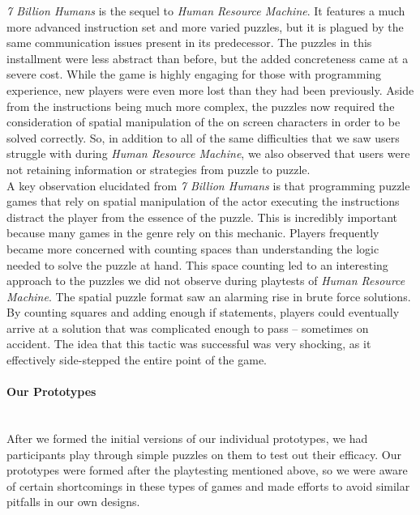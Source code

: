 \textit{7 Billion Humans} is the sequel to \textit{Human Resource Machine}.  It features a 
much more advanced instruction set and more varied puzzles, but it is plagued by the same 
communication issues present in its predecessor. The puzzles in this installment were less 
abstract than before, but the added concreteness came at a severe cost. While the game 
is highly engaging for those with programming experience, new players were even more 
lost than they had been previously. Aside from the instructions being much more complex, the 
puzzles now required the consideration of spatial manipulation of the on screen characters in 
order to be solved correctly. So, in addition to all of the same difficulties that we saw users struggle 
with during \textit{Human Resource Machine}, we also observed that users were not 
retaining information or strategies from puzzle to puzzle.\\

A key observation elucidated from \textit{7 Billion Humans} is that programming puzzle 
games that rely on spatial manipulation of the actor executing the instructions distract the 
player from the essence of the puzzle. This is incredibly important because many games in 
the genre rely on this mechanic. Players frequently became more concerned with counting 
spaces than understanding the logic needed to solve the puzzle at hand. This space counting 
led to an interesting approach to the puzzles we did not observe during playtests of 
\textit{Human Resource Machine}. The spatial puzzle format saw an alarming rise in brute 
force solutions. By counting squares and adding enough if statements, players could eventually 
arrive at a solution that was complicated enough to pass -- sometimes on accident. The idea 
that this tactic was successful was very shocking, as it effectively side-stepped the entire point 
of the game.\\

\paragraph{Our Prototypes}\mbox{} \\
After we formed the initial versions of our individual prototypes, we had participants play 
through simple puzzles on them to test out their efficacy. Our prototypes were formed after 
the playtesting mentioned above, so we were aware of certain shortcomings in these types 
of games and made efforts to avoid similar pitfalls in our own designs.\\

